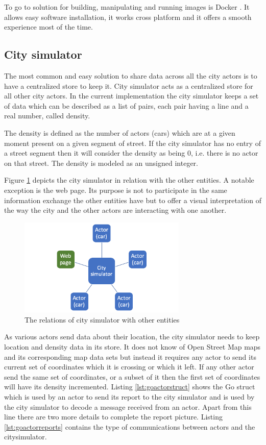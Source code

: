 \documentclass[conference]{IEEEtran}
\begin{document}
To go to solution for building, manipulating and running images is Docker \citep{docker}. It allows easy software installation, it works cross platform and it offers a smooth experience most of the time.

\subsection{City simulator}

The most common and easy solution to share data across all the city actors is to have a centralized store to keep it. City simulator acts as a centralized store for all other city actors. In the current implementation the city simulator keeps a set of data which can be described as a list of pairs, each pair having a line and a real number, called density.

The density is defined as the number of actors (cars) which are at a given moment present on a given segment of street. If the city simulator has no entry of a street segment then it will consider the density as being 0, i.e. there is no actor on that street. The density is modeled as an unsigned integer.

Figure \ref{fig:citysimrelations} depicts the city simulator in relation with the other entities. A notable exception is the web page. Its purpose is not to participate in the same information exchange the other entities have but to offer a visual interpretation of the way the city and the other actors are interacting with one another.

\begin{figure}
    \includegraphics[width=8cm]{CitySimulator.png}
    \centering
    \caption{The relations of city simulator with other entities}
    \label{fig:citysimrelations}
\end{figure}

As various actors send data about their location, the city simulator needs to keep location and density data in its store. It does not know of Open Street Map maps and its corresponding map data sets but instead it requires any actor to send its current set of coordinates which it is crossing or which it left. If any other actor send the same set of coordinates, or a subset of it then the first set of coordinates will have its density incremented. Listing \ref{lst:goactorstruct} shows the Go struct which is used by an actor to send its report to the city simulator and is used by the city simulator to decode a message received from an actor. Apart from this line there are two more details to complete the report picture. Listing \ref{lst:goactorreports} contains the type of communications between actors and the citysimulator.
\end{document}

